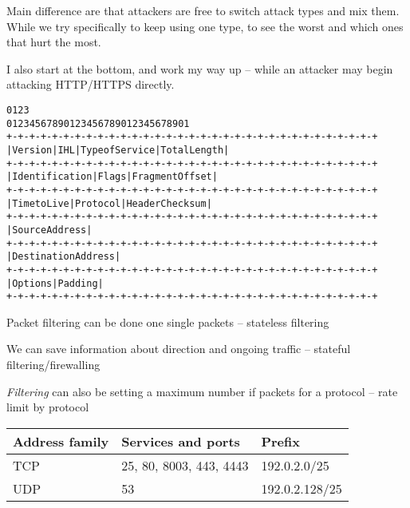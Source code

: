 \documentclass[Screen16to9,17pt]{foils}
\begin{document}
Main difference are that attackers are free to switch attack types and mix them. While we try specifically to keep using one type, to see the worst and which ones that hurt the most.

I also start at the bottom, and work my way up -- while an attacker may begin attacking HTTP/HTTPS directly.







\begin{alltt}\footnotesize
0                   1                   2                   3
0 1 2 3 4 5 6 7 8 9 0 1 2 3 4 5 6 7 8 9 0 1 2 3 4 5 6 7 8 9 0 1
+-+-+-+-+-+-+-+-+-+-+-+-+-+-+-+-+-+-+-+-+-+-+-+-+-+-+-+-+-+-+-+-+
|Version|  IHL  |Type of Service|          Total Length         |
+-+-+-+-+-+-+-+-+-+-+-+-+-+-+-+-+-+-+-+-+-+-+-+-+-+-+-+-+-+-+-+-+
|         Identification        |Flags|      Fragment Offset    |
+-+-+-+-+-+-+-+-+-+-+-+-+-+-+-+-+-+-+-+-+-+-+-+-+-+-+-+-+-+-+-+-+
|  Time to Live |    Protocol   |         Header Checksum       |
+-+-+-+-+-+-+-+-+-+-+-+-+-+-+-+-+-+-+-+-+-+-+-+-+-+-+-+-+-+-+-+-+
|                       Source Address                          |
+-+-+-+-+-+-+-+-+-+-+-+-+-+-+-+-+-+-+-+-+-+-+-+-+-+-+-+-+-+-+-+-+
|                    Destination Address                        |
+-+-+-+-+-+-+-+-+-+-+-+-+-+-+-+-+-+-+-+-+-+-+-+-+-+-+-+-+-+-+-+-+
|                    Options                    |    Padding    |
+-+-+-+-+-+-+-+-+-+-+-+-+-+-+-+-+-+-+-+-+-+-+-+-+-+-+-+-+-+-+-+-+
\end{alltt}

\begin{list2}
\item Packet filtering can be done one single packets -- stateless filtering
\item We can save information about direction and ongoing traffic -- stateful filtering/firewalling
\item \emph{Filtering} can also be setting a maximum number if packets for a protocol -- rate limit by protocol
\end{list2}



\begin{tabularx}{\textwidth-5cm}{|p{3cm}|p{7cm}|X|} \hline
{\bf Address family} & {\bf Services and ports} & {\bf Prefix}\\\hline
TCP & 25, 80, 8003, 443, 4443 & 192.0.2.0/25 \\\hline
UDP & 53 & 192.0.2.128/25 \\\hline
\end{tabularx}
\end{document}
